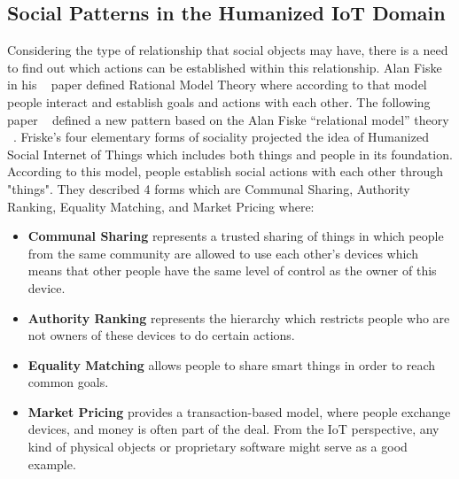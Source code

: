 \subsection{Social Patterns in the Humanized IoT Domain}
\label{sec:Social Patterns in the Humanized IoT Domain}
Considering the type of relationship that social objects may have, there is a need to find out which actions can be established within this relationship. Alan Fiske in his ~\cite{fiske1992four} paper defined Rational Model Theory where according to that model people interact and establish goals and actions with each other. The following paper ~\cite{pintus2015humanizing} defined a new pattern based on the Alan Fiske “relational model” theory ~\cite{fiske1992four}. Friske’s four elementary forms of sociality projected the idea of Humanized Social Internet of Things which includes both things and people in its foundation. According to this model, people establish social actions with each other through "things". They described 4 forms which are Communal Sharing, Authority Ranking, Equality Matching, and Market Pricing where:
\begin{itemize}
  \item  \textbf{Communal Sharing} represents a trusted sharing of things in which people from the same community are allowed to use each other's devices which means that other people have the same level of control as the owner of this device.
  \item  \textbf{Authority Ranking} represents the hierarchy which restricts people who are not owners of these devices to do certain actions. 
  \item  \textbf{Equality Matching} allows people to share smart things in order to reach common goals.
  \item  \textbf{Market Pricing} provides a transaction-based model, where people exchange devices, and money is often part of the deal. From the IoT perspective, any kind of physical objects or proprietary software might serve as a good example.
\end{itemize}

